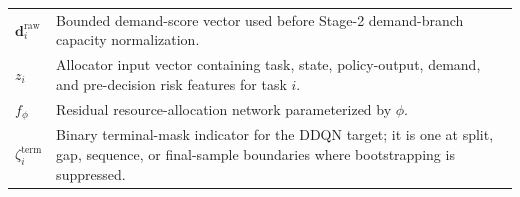 \begin{table}[!t]
\begin{tabularx}{\textwidth}{@{}lX@{}}
$\mathbf{d}^{\mathrm{raw}}_i$ & Bounded demand-score vector used before Stage-2 demand-branch capacity normalization. \\
$z_i$ & Allocator input vector containing task, state, policy-output, demand, and pre-decision risk features for task $i$. \\
$f_{\phi}$ & Residual resource-allocation network parameterized by $\phi$. \\
$\zeta_i^{\mathrm{term}}$ & Binary terminal-mask indicator for the DDQN target; it is one at split, gap, sequence, or final-sample boundaries where bootstrapping is suppressed. \\
\bottomrule
\end{tabularx}
\end{table}

